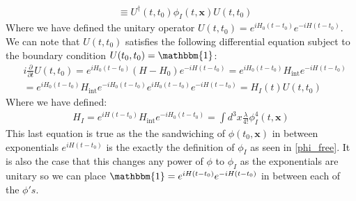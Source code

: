 \documentclass[11pt]{article}
\numberwithin{equation}{section}
\begin{document}
\begin{itemize}
\begin{align*}
        & \equiv U^{\dagger}(t,t_0)\phi_I(t,\textbf{x})U(t,t_0)
      \end{align*}
      Where we have defined the unitary operator $U(t,t_0) = e^{iH_0(t-t_0)}e^{-iH(t-t_0)}$. We can note that $U(t,t_0)$ satisfies the following differential equation subject to the boundary condition $U(t_0,t_0)= \mathbbm{1}$:
      \begin{align*}
        &i\frac{\partial}{\partial t}U(t,t_0) = e^{iH_0(t-t_0)}\left(H-H_0\right) e^{-iH(t-t_0)}=e^{iH_0(t-t_0)}H_{\text{int}} e^{-iH(t-t_0)} \\
        & = e^{iH_0(t-t_0)}H_{\text{int}}e^{-iH_0(t-t_0)} e^{iH_0(t-t_0)}  e^{-iH(t-t_0)}  = H_{I}(t)U(t,t_0)
      \end{align*}
      Where we have defined:
      \begin{align*}
        H_{I} = e^{iH(t-t_0)}H_{\text{int}}e^{-iH_0(t-t_0)} = \int d^3x \frac{\lambda}{4!}\phi_I^4(t,\textbf{x})
      \end{align*} 
      This last equation is true as the the sandwiching of $\phi(t_0,\textbf{x})$ in between exponentials $e^{iH(t-t_0)}$ is the exactly the definition of $\phi_I$ as seen in \ref{phi_free}. It is also the case that this changes any power of $\phi$ to $\phi_I$ as the exponentials are unitary so we can place $\mathbbm{1} = e^{iH(t-t_0)}e^{-iH(t-t_0)}$ in between each of the $\phi's$.
   \end{itemize}
\end{document}
